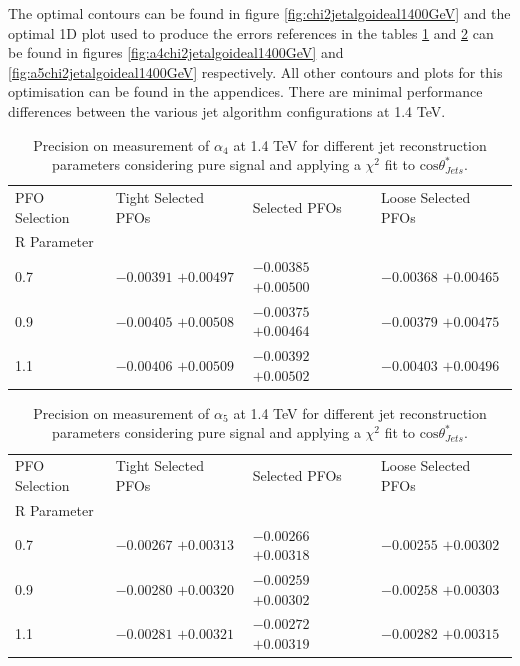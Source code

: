 The optimal contours can be found in figure \ref{fig:chi2jetalgoideal1400GeV} and the optimal 1D plot used to produce the errors references in the tables \ref{table:precisiona4signaljetalgo1400GeV} and \ref{table:precisiona5signaljetalgo1400GeV} can be found in figures \ref{fig:a4chi2jetalgoideal1400GeV} and \ref{fig:a5chi2jetalgoideal1400GeV} respectively.  All other contours and plots for this optimisation can be found in the appendices.  There are minimal performance differences between the various jet algorithm configurations at 1.4 TeV.

\begin{table}[h!]
\centering
\begin{tabular}{l l l l}
\hline
PFO Selection & Tight Selected PFOs & Selected PFOs & Loose Selected PFOs \\ 
R Parameter & & & \\ 
\hline
0.7 & $-0.00391$ $+0.00497$ & $-0.00385$ $+0.00500$ & $-0.00368$ $+0.00465$ \\
0.9 & $-0.00405$ $+0.00508$ & $-0.00375$ $+0.00464$ & $-0.00379$ $+0.00475$ \\
1.1 & $-0.00406$ $+0.00509$ & $-0.00392$ $+0.00502$ & $-0.00403$ $+0.00496$ \\
\hline
\end{tabular}
\caption[$1\sigma$ precision on measurement of $\alpha_{4}$ for different jet reconstruction parameters considering pure signal at 1.4 TeV.]{Precision on measurement of $\alpha_{4}$ at 1.4 TeV for different jet reconstruction parameters considering pure signal and applying a $\chi^{2}$ fit to $\text{cos}\theta^{*}_{Jets}$.}
\label{table:precisiona4signaljetalgo1400GeV}
\end{table}

\begin{table}[h!]
\centering
\begin{tabular}{l l l l}
\hline
PFO Selection & Tight Selected PFOs & Selected PFOs & Loose Selected PFOs \\ 
R Parameter & & & \\ 
\hline
0.7 & $-0.00267$ $+0.00313$ & $-0.00266$ $+0.00318$ & $-0.00255$ $+0.00302$ \\
0.9 & $-0.00280$ $+0.00320$ & $-0.00259$ $+0.00302$ & $-0.00258$ $+0.00303$ \\
1.1 & $-0.00281$ $+0.00321$ & $-0.00272$ $+0.00319$ & $-0.00282$ $+0.00315$ \\
\hline
\end{tabular}
\caption[$1\sigma$ precision on measurement of $\alpha_{5}$ for different jet reconstruction parameters considering pure signal at 1.4 TeV.]{Precision on measurement of $\alpha_{5}$ at 1.4 TeV for different jet reconstruction parameters considering pure signal and applying a $\chi^{2}$ fit to $\text{cos}\theta^{*}_{Jets}$.}
\label{table:precisiona5signaljetalgo1400GeV}
\end{table}

